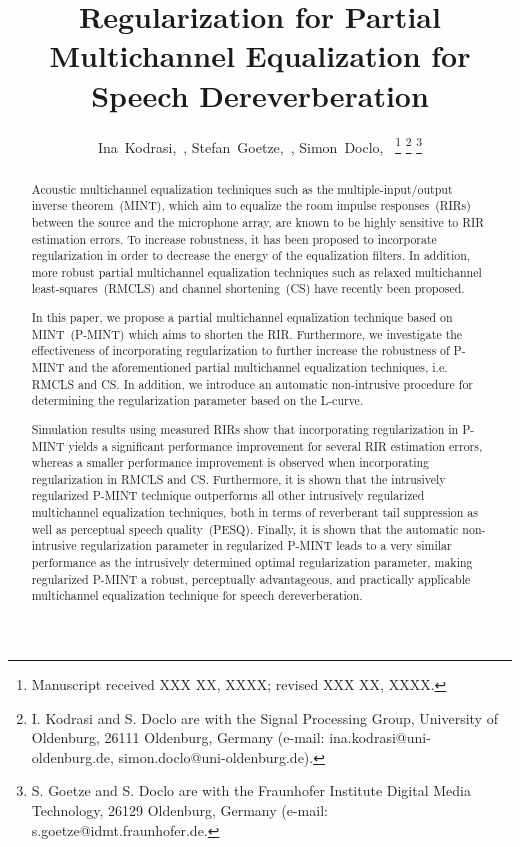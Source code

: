 \documentclass[10pt]{IEEEtran}
\begin{document}
%
\title{Regularization for Partial Multichannel Equalization for Speech Dereverberation}

\author{%
  Ina~Kodrasi,~, Stefan~Goetze,~, Simon~Doclo,~%
  \thanks{Manuscript received XXX XX, XXXX; revised XXX XX, XXXX.}%
  \thanks{I. Kodrasi and S. Doclo are with the Signal Processing Group, University of Oldenburg, 26111 Oldenburg, Germany (e-mail: ina.kodrasi@uni-oldenburg.de, simon.doclo@uni-oldenburg.de).}%
  \thanks{S. Goetze and S. Doclo are with the Fraunhofer Institute Digital Media Technology, 26129 Oldenburg, Germany (e-mail: s.goetze@idmt.fraunhofer.de.}%
}


\maketitle
\newpage

\begin{abstract}
\boldmath
Acoustic multichannel equalization techniques such as the multiple-input/output inverse theorem~(MINT), which aim to equalize the room impulse responses~(RIRs) between the source and the microphone array, are known to be highly sensitive to RIR estimation errors.
To increase robustness, it has been proposed to incorporate regularization in order to decrease the energy of the equalization filters.
In addition, more robust partial multichannel equalization techniques such as relaxed multichannel least-squares~(RMCLS) and channel shortening~(CS) have recently been proposed.

In this paper, we propose a partial multichannel equalization technique based on MINT~(P-MINT) which aims to shorten the RIR.
Furthermore, we investigate the effectiveness of incorporating regularization to further increase the robustness of P-MINT and the aforementioned partial multichannel equalization techniques, i.e. RMCLS and CS.
In addition, we introduce an automatic non-intrusive procedure for determining the regularization parameter based on the L-curve.

Simulation results using measured RIRs show that incorporating regularization in P-MINT yields a significant performance improvement for several RIR estimation errors, whereas a smaller performance improvement is observed when incorporating regularization in RMCLS and CS.
Furthermore, it is shown that the intrusively regularized P-MINT technique outperforms all other intrusively regularized multichannel equalization techniques, both in terms of reverberant tail suppression as well as perceptual speech quality~(PESQ).
Finally, it is shown that the automatic non-intrusive regularization parameter in regularized P-MINT leads to a very similar performance as the intrusively determined optimal regularization parameter, making regularized P-MINT a robust, perceptually advantageous, and practically applicable multichannel equalization technique for speech dereverberation.



\end{abstract}
\end{document}
